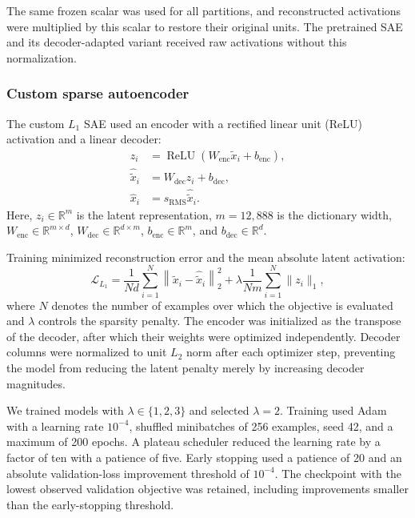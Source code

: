 \documentclass[pdflatex,sn-mathphys-num]{sn-jnl}
\theoremstyle{thmstylethree}%
\begin{document}
The same frozen scalar was used for all partitions, and reconstructed activations were multiplied by this scalar to restore their original units. The
pretrained SAE and its decoder-adapted variant received raw activations without this normalization.


\subsubsection{Custom sparse autoencoder}

The custom $L_1$ SAE used an encoder with a rectified linear unit
(ReLU) activation and a linear decoder:
\begin{align}
z_i
&=
\operatorname{ReLU}
\left(W_{\mathrm{enc}}\tilde{x}_i+b_{\mathrm{enc}}\right),
\\
\hat{\tilde{x}}_i
&=
W_{\mathrm{dec}}z_i+b_{\mathrm{dec}},
\\
\hat{x}_i
&=
s_{\mathrm{RMS}}\hat{\tilde{x}}_i.
\end{align}
Here, $z_i\in\mathbb{R}^{m}$ is the latent representation,
$m=12{,}888$ is the dictionary width,
$W_{\mathrm{enc}}\in\mathbb{R}^{m\times d}$,
$W_{\mathrm{dec}}\in\mathbb{R}^{d\times m}$,
$b_{\mathrm{enc}}\in\mathbb{R}^{m}$, and
$b_{\mathrm{dec}}\in\mathbb{R}^{d}$.

Training minimized reconstruction error and the mean absolute latent
activation:
\begin{equation}
\mathcal{L}_{L_1}
=
\frac{1}{Nd}
\sum_{i=1}^{N}
\left\|
\tilde{x}_i-\hat{\tilde{x}}_i
\right\|_2^2
+
\lambda
\frac{1}{Nm}
\sum_{i=1}^{N}
\|z_i\|_1,
\end{equation}
where $N$ denotes the number of examples over which the objective
is evaluated and $\lambda$ controls the sparsity penalty. The
encoder was initialized as the transpose of the decoder, after
which their weights were optimized independently. Decoder columns
were normalized to unit $L_2$ norm after each optimizer step,
preventing the model from reducing the latent penalty merely by
increasing decoder magnitudes.


We trained models with $\lambda\in\{1,2,3\}$ and selected $\lambda=2$. Training used Adam \cite{kingma2015adam} with a learning rate $10^{-4}$, shuffled minibatches of 256 examples, seed 42,
and a maximum of 200 epochs. A plateau scheduler reduced the learning rate by a factor of ten with a patience of five. Early stopping used a patience of 20 and an absolute validation-loss 
improvement threshold of $10^{-4}$. The checkpoint with the lowest observed validation objective was retained, including improvements smaller than the early-stopping threshold.
\end{document}
